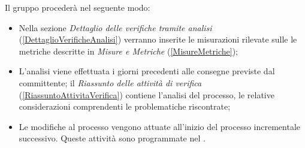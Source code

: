 	Il gruppo procederà nel seguente modo: 
	\begin{itemize}
		\item Nella sezione \emph{Dettaglio delle verifiche tramite analisi} (\ref{DettaglioVerificheAnalisi}) verranno inserite le misurazioni rilevate sulle le metriche descritte in \emph{Misure e Metriche} (\ref{MisureMetriche});
		\item L'analisi viene effettuata i giorni precedenti alle consegne previste dal committente; il \emph{Riassunto delle attività di verifica} (\ref{RiassuntoAttivitaVerifica}) contiene l'analisi del processo, le relative considerazioni  comprendenti le problematiche riscontrate;
		\item Le modifiche al processo vengono attuate all'inizio del processo incrementale successivo. Queste attività sono programmate nel \PianoDiProgetto.
	\end{itemize}
	
	
	
	
	
